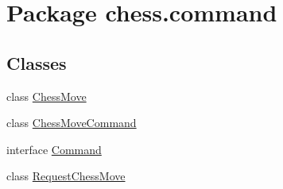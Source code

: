 \hypertarget{namespacechess_1_1command}{}\section{Package chess.\+command}
\label{namespacechess_1_1command}
\subsection*{Classes}
\begin{DoxyCompactItemize}
\item 
class \mbox{\hyperlink{classchess_1_1command_1_1_chess_move}{Chess\+Move}}
\item 
class \mbox{\hyperlink{classchess_1_1command_1_1_chess_move_command}{Chess\+Move\+Command}}
\item 
interface \mbox{\hyperlink{interfacechess_1_1command_1_1_command}{Command}}
\item 
class \mbox{\hyperlink{classchess_1_1command_1_1_request_chess_move}{Request\+Chess\+Move}}
\end{DoxyCompactItemize}
